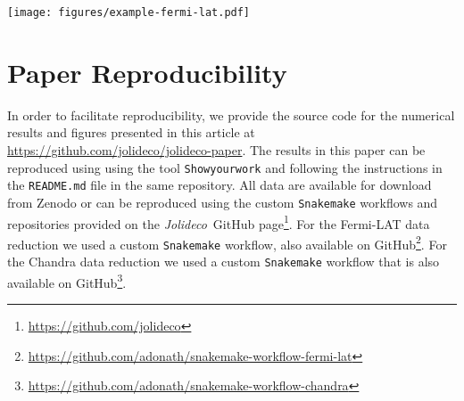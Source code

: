 \documentclass[twocolumn]{aastex631}
\newcommand{\fermi}{\textit{Fermi}-LAT~}
\newcommand{\jolideco}{\textit{Jolideco}~}
\begin{document}
      \begin{figure*}
        \begin{centering}
            \texttt{[image: figures/example-fermi-lat.pdf]}
            \caption{
                Illustration of the \jolideco result for the \fermi data of the supernova remnant \textit{RX J0852.0-4622} or \textit{Vela Junior}. The left image shows the counts above \qty[mode = text]{10}{GeV}. The different event classes are stacked into a single image with bin size $0.02$~degrees. The image in the center shows the flux reconstructed by the \jolideco method. The image on the right shows the standardized residuals as computed by Equation~\ref{eq:approx-sigma} and smoothed with a \textit{Gaussian} kernel of width 5~pixels $\approx 0.1$~degrees, similar to the size of the PSF.
                More information on this analysis example can be found on \url{https://github.com/jolideco/jolideco-fermi-examples}.
            }
            \label{fig:example-fermi-lat}
        \end{centering}
    \end{figure*}
    
    \section{Paper Reproducibility}
    \label{sec:reproducibility}

    In order to facilitate reproducibility, we provide the source code for the numerical results
    and figures presented in this article at \url{https://github.com/jolideco/jolideco-paper}. The results in this paper can be reproduced using using the tool \texttt{Showyourwork} \citep{Luger2021} and following the instructions in the \texttt{README.md} file in the same repository. All data are available for download from Zenodo or can be reproduced using the custom  \texttt{Snakemake} workflows and repositories provided on the \jolideco GitHub page\footnote{\url{https://github.com/jolideco}}. For the Fermi-LAT data reduction we used a custom \texttt{Snakemake} workflow, also  available on GitHub\footnote{\url{https://github.com/adonath/snakemake-workflow-fermi-lat}}. For the Chandra data reduction we used a custom \texttt{Snakemake} workflow that is also available on GitHub\footnote{\url{https://github.com/adonath/snakemake-workflow-chandra}}.

            
    
\end{document}
